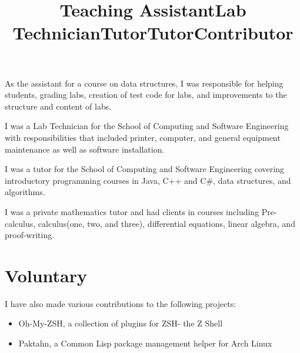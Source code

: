 \documentclass[margintitle,line]{res}
\renewcommand{\subsection}[1]{\section{\normalfont #1}}
\begin{document}
\begin{resume}
\title{Teaching Assistant}
\begin{position}
 As the assistant for a course on data structures, I was responsible for helping students, grading labs, creation of test code for labs, and improvements to the structure and content of labs.
\end{position}

\title{Lab Technician}
\begin{position}
I was a Lab Technician for the School of Computing and Software Engineering with responsibilities that included printer, computer, and general equipment maintenance as well as software installation.
\end{position}

\title{Tutor}
\begin{position}
I was a tutor for the School of Computing and Software Engineering covering introductory programming courses in Java, C++ and C\#, data structures, and algorithms.
\end{position}


\title{Tutor}
\begin{position}
I was a private mathematics tutor and had clients in courses including Pre-calculus, calculus(one, two, and three), differential equations, linear algebra, and proof-writing.
\end{position}

%
%
\subsection{Voluntary}

\title{Contributor}
\begin{position}
I have also made various contributions to the following projects:
\begin{itemize}
\item{Oh-My-ZSH, a collection of plugins for ZSH- the Z Shell}
\item{Paktahn, a Common Lisp package management helper for Arch Linux}
\end{itemize}
\end{position}


\end{resume}
\end{document}
